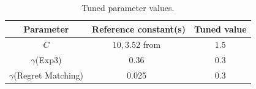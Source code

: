 \documentclass{article}
\begin{document}
\begin{table}[h!]
\begin{minipage}{.4\textwidth}
\begin{tabular}{|c||c|c|}
							\hline
Parameter			& Reference constant(s)                             & Tuned value	\\ \hline\hline
    $C$				& $10,3.52$ from~\cite{teuling_tron,cig_paper}	& $1.5$		\\ \hline
$\gamma$(Exp3) & 0.36~\cite{cig_paper}		& 0.3		\\ \hline
$\gamma$(Regret Matching)	& 0.025~\cite{mcts_goofspiel}				& 0.3		\\ \hline
\end{tabular}
\caption{Tuned parameter values. \label{tbl:tunedvals} }
\end{minipage}
\end{table}
\end{document}
